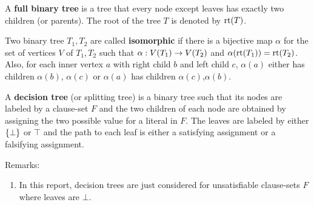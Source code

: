 \documentclass{report}
\begin{document}
A \textbf{full binary tree} is a tree that every node except leaves has exactly two children (or parents). The root of the tree $T$ is denoted by $\operatorname{rt}(T)$.

\begin{defi}\label{def:isomo-trees}
Two binary tree $T_1, T_2$ are called \textbf{isomorphic} if there is a bijective map $\alpha$ for the set of vertices $V$ of $T_1, T_2$ such that $\alpha: V(T_1) \rightarrow V(T_2)$ and $\alpha(\operatorname{rt}(T_1))=\operatorname{rt}(T_2)$. Also, for each inner vertex $a$ with right child $b$ and left child $c$, $\alpha(a)$ either has children $\alpha(b)$, $\alpha(c)$ or $\alpha(a)$ has children $\alpha(c)$,$\alpha(b)$.
\end{defi}

\begin{defi}\label{def:decs-tree}
A \textbf{decision tree} (or splitting tree) is a binary tree such that its nodes are labeled by a clause-set $F$ and the two children of each node are obtained by assigning the two possible value for a literal in $F$. The leaves are labeled by either $\{ \bot \}$ or $\top$ and the path to each leaf is either a satisfying assignment or a falsifying assignment.
\end{defi}
Remarks:
  \begin{enumerate}
  \item  In this report, decision trees are just considered for unsatisfiable clause-sets $F$ where leaves are $\bot$.
  \end{enumerate}
\end{document}
